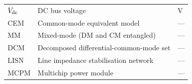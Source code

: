 \begin{center}
\begin{tabular}{lll}
$V_{\mathrm{dc}}$              & DC bus voltage                                  & V   \\
CEM                 & Common-mode equivalent model                    & --- \\
MM                  & Mixed-mode (DM and CM entangled)                & --- \\
DCM                 & Decomposed differential-common-mode set         & --- \\
LISN                & Line impedance stabilisation network            & --- \\
MCPM                & Multichip power module                          & --- \\
\bottomrule
\end{tabular}
\end{center}

